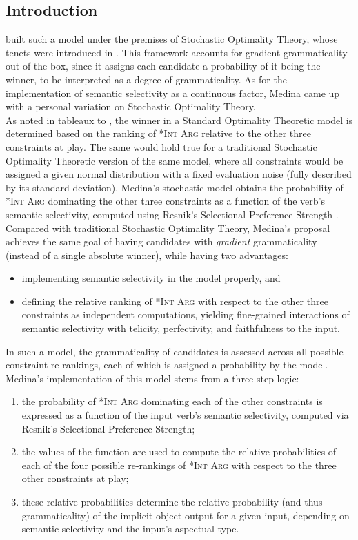 \subsection{Introduction}

\textcite{Medina2007} built such a model under the premises of Stochastic Optimality Theory, whose tenets were introduced in . This framework accounts for gradient grammaticality out-of-the-box, since it assigns each candidate a probability of it being the winner, to be interpreted as a degree of grammaticality. As for the implementation of semantic selectivity as a continuous factor, Medina came up with a personal variation on Stochastic Optimality Theory.\\
As noted in tableaux  to , the winner in a Standard Optimality Theoretic model is determined based on the ranking of \textsc{*Int Arg} relative to the other three constraints at play. The same would hold true for a traditional Stochastic Optimality Theoretic version of the same model, where all constraints would be assigned a given normal distribution with a fixed evaluation noise (fully described by its standard deviation). Medina's stochastic model obtains the probability of \textsc{*Int Arg} dominating the other three constraints as a function of the verb's semantic selectivity, computed using Resnik's Selectional Preference Strength \parencite{Resnik1993,Resnik1996}. Compared with traditional Stochastic Optimality Theory, Medina's proposal achieves the same goal of having candidates with \textit{gradient} grammaticality (instead of a single absolute winner), while having two advantages:
\begin{itemize}
    \item implementing semantic selectivity in the model properly, and
    \item defining the relative ranking of \textsc{*Int Arg} with respect to the other three constraints as independent computations, yielding fine-grained interactions of semantic selectivity with telicity, perfectivity, and faithfulness to the input.
\end{itemize}
In such a model, the grammaticality of candidates is assessed across all possible constraint re-rankings, each of which is assigned a probability by the model. Medina's implementation of this model stems from a three-step logic: 
\begin{enumerate}
    \item the probability of \textsc{*Int Arg} dominating each of the other constraints is expressed as a function of the input verb's semantic selectivity, computed via Resnik's Selectional Preference Strength;
    \item the values of the function are used to compute the relative probabilities of each of the four possible re-rankings of \textsc{*Int Arg} with respect to the three other constraints at play;
    \item these relative probabilities determine the relative probability (and thus grammaticality) of the implicit object output for a given input, depending on semantic selectivity and the input's aspectual type.
\end{enumerate}

